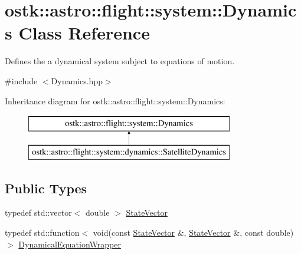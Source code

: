 \hypertarget{classostk_1_1astro_1_1flight_1_1system_1_1_dynamics}{}\section{ostk\+:\+:astro\+:\+:flight\+:\+:system\+:\+:Dynamics Class Reference}
\label{classostk_1_1astro_1_1flight_1_1system_1_1_dynamics}


Defines the a dynamical system subject to equations of motion.  




{\ttfamily \#include $<$Dynamics.\+hpp$>$}

Inheritance diagram for ostk\+:\+:astro\+:\+:flight\+:\+:system\+:\+:Dynamics\+:\begin{figure}[H]
\begin{center}
\leavevmode
\includegraphics[height=2.000000cm]{classostk_1_1astro_1_1flight_1_1system_1_1_dynamics}
\end{center}
\end{figure}
\subsection*{Public Types}
\begin{DoxyCompactItemize}
\item 
typedef std\+::vector$<$ double $>$ \hyperlink{classostk_1_1astro_1_1flight_1_1system_1_1_dynamics_a7a04f804b15e0f12d76f3f1f437f5169}{State\+Vector}
\item 
typedef std\+::function$<$ void(const \hyperlink{classostk_1_1astro_1_1flight_1_1system_1_1_dynamics_a7a04f804b15e0f12d76f3f1f437f5169}{State\+Vector} \&, \hyperlink{classostk_1_1astro_1_1flight_1_1system_1_1_dynamics_a7a04f804b15e0f12d76f3f1f437f5169}{State\+Vector} \&, const double)$>$ \hyperlink{classostk_1_1astro_1_1flight_1_1system_1_1_dynamics_a9b14f4fbea6fe1e96af9e71545d4c77e}{Dynamical\+Equation\+Wrapper}
\end{DoxyCompactItemize}
